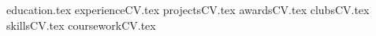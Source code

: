 \documentclass[12pt, a4paper]{awesome-cv}
\newcommand*{\sectiondir}{files/}
\begin{document}
\makecvheader

{education.tex}
{experienceCV.tex}
{projectsCV.tex}
{awardsCV.tex}
{clubsCV.tex}
{skillsCV.tex}
{courseworkCV.tex}
\end{document}
